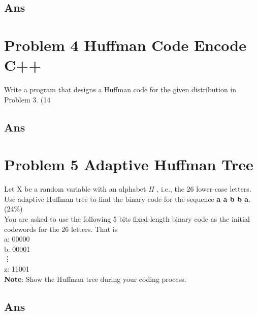 \documentclass[a4paper, 11pt]{article}
\begin{document}
\subsection*{Ans}
\section*{Problem 4 Huffman Code Encode C++}
Write a program that designs a Huffman code for the given distribution in Problem 3. (14%
\subsection*{Ans}
\section*{Problem 5 Adaptive Huffman Tree}
Let X be a random variable with an alphabet $H$ , i.e., the 26 lower-case letters.
Use adaptive Huffman tree to find the binary code for the sequence \textbf{a a b b a}.
(24\%) \\
You are asked to use the following 5 bits fixed-length binary code as the initial codewords for
the 26 letters. That is \\
a: 00000 \\
b: 00001 \\
\vdots \\
z: 11001 \\
\textbf{Note}: Show the Huffman tree during your coding process.
\subsection*{Ans}
\end{document}
